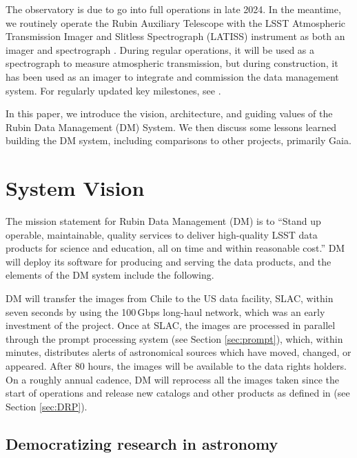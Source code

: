 \documentclass[11pt,twoside]{article}
\begin{document}
The observatory is due to go into full operations in late 2024.
In the meantime, we routinely operate the Rubin Auxiliary Telescope with the LSST Atmospheric Transmission Imager and Slitless Spectrograph (LATISS) instrument as both an imager and spectrograph \citep{2020SPIE11452E..0UI}.
During regular operations, it will be used as a spectrograph to measure atmospheric transmission, but during construction, it has been used as an imager to integrate and commission the data management system.
For regularly updated key milestones, see \citet{DMTN-232}.

In this paper, we introduce the vision, architecture, and guiding values of the Rubin Data Management (DM) System. We then discuss some lessons learned building the DM system, including comparisons to other projects, primarily Gaia.


\section{System Vision}

The mission statement for Rubin Data Management (DM) is to ``Stand up operable, maintainable, quality services to deliver high-quality LSST data products for science and education, all on time and within reasonable cost.'' DM will deploy its software for producing and serving the data products, and the elements of the DM system include the following.

DM will transfer the images from Chile to the US data facility, SLAC, within seven seconds by using the 100\,Gbps long-haul network, which was an early investment of the project.
Once at SLAC, the images are processed in parallel through the prompt processing system (see Section \ref{sec:prompt}), which, within minutes, distributes alerts of astronomical sources which have moved, changed, or appeared.
After 80 hours, the images will be available to the data rights holders.
On a roughly annual cadence, DM will reprocess all the images taken since the start of operations and release new catalogs and other products as defined in \citet{LSE-163} (see Section \ref{sec:DRP}).


\subsection{Democratizing research in astronomy}
\end{document}
